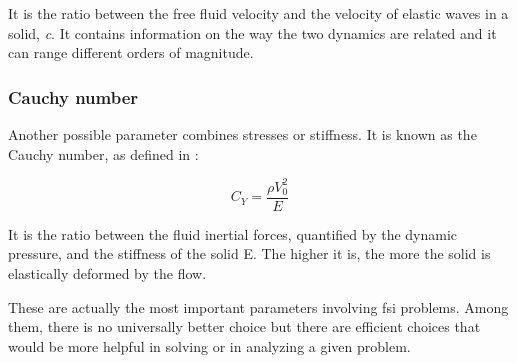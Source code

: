 It is the ratio between the free fluid velocity and the velocity of elastic waves in a solid, \textit{c}. It contains information on the way the two dynamics are related and it can range different orders of magnitude.

\subsubsection{Cauchy number}

Another possible parameter combines stresses or stiffness. It is known as the  Cauchy number, as defined in \cite{de2001fluides}:

\begin{equation}
	C_Y = \frac{\rho V_0^2}{E}
\end{equation}

It is the ratio between the fluid inertial forces, quantified by the dynamic pressure, and the stiffness of the solid E. 
The higher it is, the more the solid is elastically deformed by the flow.


These are actually the most important parameters involving \acrlong{fsi} problems. Among them, there is no universally better choice but there are efficient choices that would be more helpful
in solving or in analyzing a given problem. 



